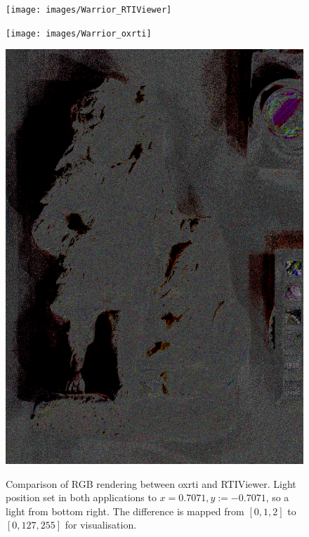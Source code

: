 \begin{figure}
\begin{subfloat}{\texttt{[image: images/Warrior\_RTIViewer]}}\end{subfloat}
\begin{subfloat}{\texttt{[image: images/Warrior\_oxrti]}}\end{subfloat}
\begin{subfloat}{\includegraphics[max width=0.32\linewidth]{images/Warrior_diff}}\end{subfloat}

\caption[Warrior Comparison]{Comparison of RGB rendering between oxrti and RTIViewer. Light position
set in both applications to $x=0.7071, y:=-0.7071$, so a light from bottom
right. The difference is mapped from $[0,1,2]$ to $[0,127,255]$
for visualisation.}
\label{compare1}
\end{figure}

